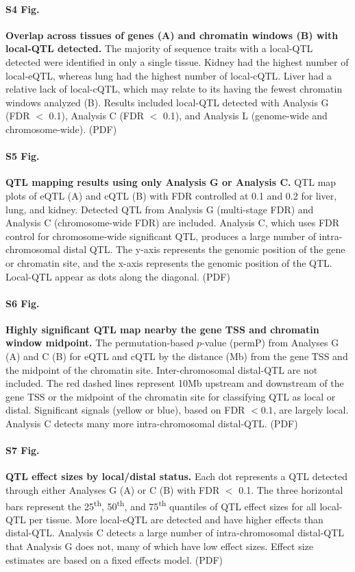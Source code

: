 \documentclass[10pt,letterpaper]{article}
\begin{document}
\paragraph*{S4 Fig.}
\label{S_upset_qtl}
{\bf Overlap across tissues of genes (A) and chromatin windows (B) with local-QTL detected.} 
The majority of sequence traits with a local-QTL detected were identified in only a single tissue. Kidney had the highest number of local-eQTL, whereas lung had the highest number of local-cQTL. Liver had a relative lack of local-cQTL, which may relate to its having the fewest chromatin windows analyzed (B). Results included local-QTL detected with Analysis G (FDR $<$ 0.1), Analysis C (FDR $<$ 0.1), and Analysis L (genome-wide and chromosome-wide). (PDF)

\paragraph*{S5 Fig.}
\label{S_grid_plot_lenient}
{\bf QTL mapping results using only Analysis G or Analysis C.}
QTL map plots of eQTL (A) and cQTL (B) with FDR controlled at 0.1 and 0.2 for liver, lung, and kidney. Detected QTL from Analysis G (multi-stage FDR) and Analysis C (chromosome-wide FDR) are included. Analysis C, which uses FDR control for chromosome-wide significant QTL, produces a large number of intra-chromosomal distal QTL. The y-axis represents the genomic position of the gene or chromatin site, and the x-axis represents the genomic position of the QTL. Local-QTL appear as dots along the diagonal. (PDF)

\paragraph*{S6 Fig.}
\label{S_dist}
{\bf Highly significant QTL map nearby the gene TSS and chromatin window midpoint.}
The permutation-based $p$-value (permP) from Analyses G (A) and C (B) for eQTL and cQTL by the distance (Mb) from the gene TSS and the midpoint of the chromatin site. Inter-chromosomal distal-QTL are not included. The red dashed lines represent 10Mb upstream and downstream of the gene TSS or the midpoint of the chromatin site for classifying QTL as local or distal. Significant signals (yellow or blue), based on FDR $< 0.1$, are largely local. Analysis C detects many more intra-chromosomal distal-QTL. (PDF)

\paragraph*{S7 Fig.}
\label{S_effect_size_status}
{\bf QTL effect sizes by local/distal status.}
Each dot represents a QTL detected through either Analyses G (A) or C (B) with FDR $<$ 0.1. The three horizontal bars represent the 25\textsuperscript{th}, 50\textsuperscript{th}, and 75\textsuperscript{th} quantiles of QTL effect sizes for all local-QTL per tissue. More local-eQTL are detected and have higher effects than distal-QTL. Analysis C detects a large number of intra-chromosomal distal-QTL that Analysis G does not, many of which have low effect sizes. Effect size estimates are based on a fixed effects model. (PDF)
\end{document}

